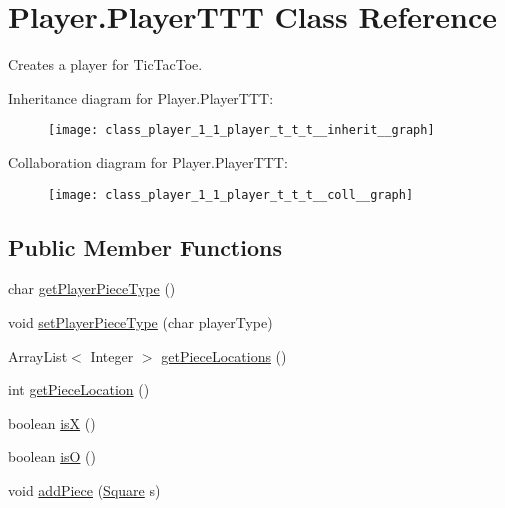 \hypertarget{class_player_1_1_player_t_t_t}{}\section{Player.\+Player\+T\+T\+T Class Reference}
\label{class_player_1_1_player_t_t_t}


Creates a player for Tic\+Tac\+Toe.  




Inheritance diagram for Player.\+Player\+T\+T\+T\+:
\nopagebreak
\begin{figure}[H]
\begin{center}
\leavevmode
\texttt{[image: class\_player\_1\_1\_player\_t\_t\_t\_\_inherit\_\_graph]}
\end{center}
\end{figure}


Collaboration diagram for Player.\+Player\+T\+T\+T\+:
\nopagebreak
\begin{figure}[H]
\begin{center}
\leavevmode
\texttt{[image: class\_player\_1\_1\_player\_t\_t\_t\_\_coll\_\_graph]}
\end{center}
\end{figure}
\subsection*{Public Member Functions}
\begin{DoxyCompactItemize}
\item 
char \hyperlink{class_player_1_1_player_t_t_t_ab8b6942da0005040404d3ac02c71e463}{get\+Player\+Piece\+Type} ()
\item 
void \hyperlink{class_player_1_1_player_t_t_t_ae624b6b5a46f011a667e0562ad150091}{set\+Player\+Piece\+Type} (char player\+Type)
\item 
Array\+List$<$ Integer $>$ \hyperlink{class_player_1_1_player_t_t_t_a491c3a16684131362d6808e4827d566e}{get\+Piece\+Locations} ()
\item 
int \hyperlink{class_player_1_1_player_t_t_t_aee939d68fa0f319d0e6101a9373e7c7e}{get\+Piece\+Location} ()
\item 
boolean \hyperlink{class_player_1_1_player_t_t_t_ace718e5b67209360615144048fd1814a}{is\+X} ()
\item 
boolean \hyperlink{class_player_1_1_player_t_t_t_ac3f8f41bc0b24865c80283d5a84be6d4}{is\+O} ()
\item 
void \hyperlink{class_player_1_1_player_t_t_t_ab3d884c71bcd92b42bea5a413caa95e8}{add\+Piece} (\hyperlink{class_square_1_1_square}{Square} s)
\end{DoxyCompactItemize}
